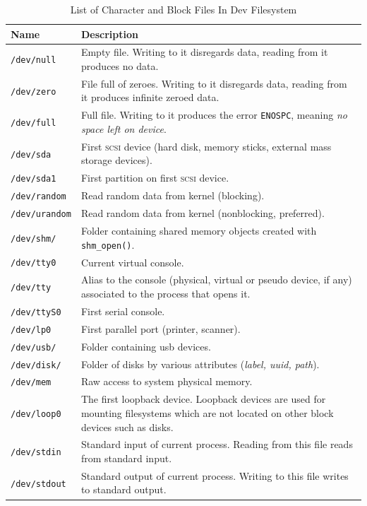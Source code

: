 \documentclass[a4paper]{article}
\begin{document}
\begin{table}
\renewcommand{\arraystretch}{1.25}
\centering\caption{List of Character and Block Files In Dev Filesystem}\label{tbl:devfs}
\begin{tabular}{@{}lp{8cm}@{}}
\toprule
Name & Description\\
\midrule
\texttt{/dev/null} & Empty file. Writing to it disregards data, reading from it produces no data.\\
\texttt{/dev/zero} & File full of zeroes. Writing to it disregards data, reading from it produces infinite zeroed data.\\
\texttt{/dev/full} & Full file. Writing to it produces the error \verb|ENOSPC|, meaning \emph{no space left on device}.\\
\texttt{/dev/sda} & 
First \textsc{scsi} device (hard disk, memory sticks, external mass storage devices).\\
\texttt{/dev/sda1} & First partition on first \textsc{scsi} device.\\
\texttt{/dev/random} & Read random data from kernel (blocking).\\
\texttt{/dev/urandom} & Read random data from kernel (nonblocking, preferred).\\
\texttt{/dev/shm/} & Folder containing shared memory objects created with \verb|shm_open()|.\\
\texttt{/dev/tty0} & Current virtual console.\\
\texttt{/dev/tty} & Alias to the console (physical, virtual or pseudo device, if any) associated to the process that opens it.\\
\texttt{/dev/ttyS0} & First serial console.\\
\texttt{/dev/lp0} & First parallel port (printer, scanner).\\
\texttt{/dev/usb/} & Folder containing \gls{usb} devices.\\
\texttt{/dev/disk/} & Folder of disks by various attributes (\emph{label, uuid, path}).\\
\texttt{/dev/mem} & Raw access to system physical memory.\\
\texttt{/dev/loop0} & The first loopback device. Loopback devices are used for mounting filesystems which are not located on other block devices such as disks.\\
\texttt{/dev/stdin} & Standard input of current process. Reading from this file reads from standard input.\\
\texttt{/dev/stdout} & Standard output of current process. Writing to this file writes to standard output.\\
\bottomrule
\end{tabular}
\end{table}
\end{document}
